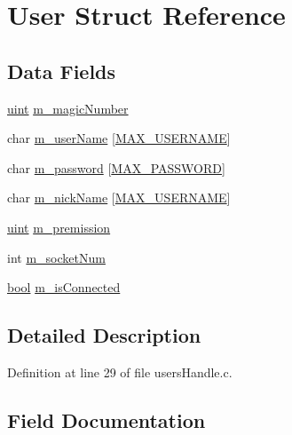 \hypertarget{structUser}{}\section{User Struct Reference}
\label{structUser}
\subsection*{Data Fields}
\begin{DoxyCompactItemize}
\item 
\hyperlink{tcp_8h_a91ad9478d81a7aaf2593e8d9c3d06a14}{uint} \hyperlink{structUser_a19ebfc0785dfc3e5eeb33e843e5c8ebb}{m\+\_\+magic\+Number}
\item 
char \hyperlink{structUser_a17651ccbee4a3a4c4bb988f01a14bee3}{m\+\_\+user\+Name} \mbox{[}\hyperlink{Protocol_8h_a2d9316e742860ef57fe46a27e67d5efe}{M\+A\+X\+\_\+\+U\+S\+E\+R\+N\+A\+ME}\mbox{]}
\item 
char \hyperlink{structUser_afcd5f5b3dfd0847cbfbbb5c8b3cc9bb0}{m\+\_\+password} \mbox{[}\hyperlink{Protocol_8h_ac39f75a2a532f10f6fb237e96c530dcb}{M\+A\+X\+\_\+\+P\+A\+S\+S\+W\+O\+RD}\mbox{]}
\item 
char \hyperlink{structUser_a14a68112d918e8d752ec614133fa2065}{m\+\_\+nick\+Name} \mbox{[}\hyperlink{Protocol_8h_a2d9316e742860ef57fe46a27e67d5efe}{M\+A\+X\+\_\+\+U\+S\+E\+R\+N\+A\+ME}\mbox{]}
\item 
\hyperlink{tcp_8h_a91ad9478d81a7aaf2593e8d9c3d06a14}{uint} \hyperlink{structUser_a8026b03d19d534453dfb5359d46a03f0}{m\+\_\+premission}
\item 
int \hyperlink{structUser_aefd63dee13460eb38eb44e4cef79962b}{m\+\_\+socket\+Num}
\item 
\hyperlink{whatDownBackEndApp_8c_a1062901a7428fdd9c7f180f5e01ea056}{bool} \hyperlink{structUser_aa3f8d2f1da5048f5e13499aa64bb41d9}{m\+\_\+is\+Connected}
\end{DoxyCompactItemize}


\subsection{Detailed Description}


Definition at line 29 of file users\+Handle.\+c.



\subsection{Field Documentation}
